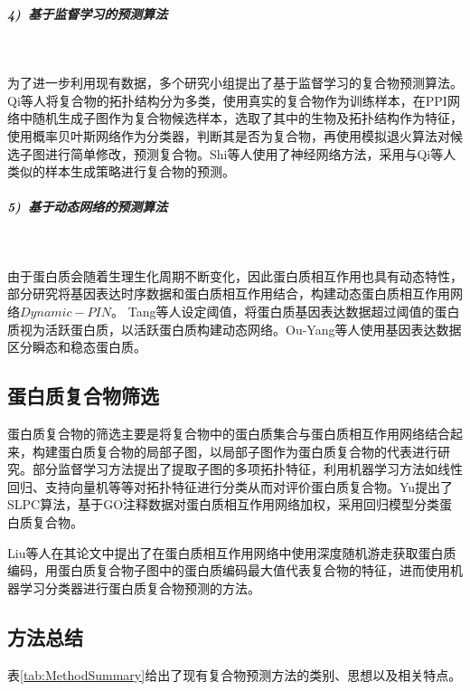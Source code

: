 \subparagraph*{4)~基于监督学习的预测算法} ~

为了进一步利用现有数据，多个研究小组提出了基于监督学习的复合物预测算法。Qi等人\cite{qi_protein_2008}将复合物的拓扑结构分为多类，使用真实的复合物作为训练样本，在PPI网络中随机生成子图作为复合物候选样本，选取了其中的生物及拓扑结构作为特征，使用概率贝叶斯网络作为分类器，判断其是否为复合物，再使用模拟退火算法对候选子图进行简单修改，预测复合物。Shi等人\cite{shi_protein_2011}使用了神经网络方法，采用与Qi等人类似的样本生成策略进行复合物的预测。

\subparagraph*{5)~基于动态网络的预测算法} ~

由于蛋白质会随着生理生化周期不断变化，因此蛋白质相互作用也具有动态特性，部分研究\cite{li_dynamic_2017}将基因表达时序数据和蛋白质相互作用结合，构建动态蛋白质相互作用网络$Dynamic-PIN$。
Tang等人\cite{tang_comparison_2011}设定阈值，将蛋白质基因表达数据超过阈值的蛋白质视为活跃蛋白质，以活跃蛋白质构建动态网络。Ou-Yang等人\cite{ou-yang_detecting_2014}使用基因表达数据区分瞬态和稳态蛋白质。

\subsection{蛋白质复合物筛选}
\label{subsection:research:Selection}

蛋白质复合物的筛选主要是将复合物中的蛋白质集合与蛋白质相互作用网络结合起来，构建蛋白质复合物的局部子图，以局部子图作为蛋白质复合物的代表进行研究。部分监督学习方法\cite{dong_predicting_2018}提出了提取子图的多项拓扑特征，利用机器学习方法如线性回归、支持向量机等等对拓扑特征进行分类从而对评价蛋白质复合物。Yu\cite{yu_protein_2015}提出了SLPC算法，基于GO注释数据对蛋白质相互作用网络加权，采用回归模型分类蛋白质复合物。

Liu等人\cite{liu_identifying_2018}在其论文中提出了在蛋白质相互作用网络中使用深度随机游走获取蛋白质编码，用蛋白质复合物子图中的蛋白质编码最大值代表复合物的特征，进而使用机器学习分类器进行蛋白质复合物预测的方法。

\subsection{方法总结}
\label{subsection:research:researchSummary}

表\ref{tab:MethodSummary}给出了现有复合物预测方法的类别、思想以及相关特点。


